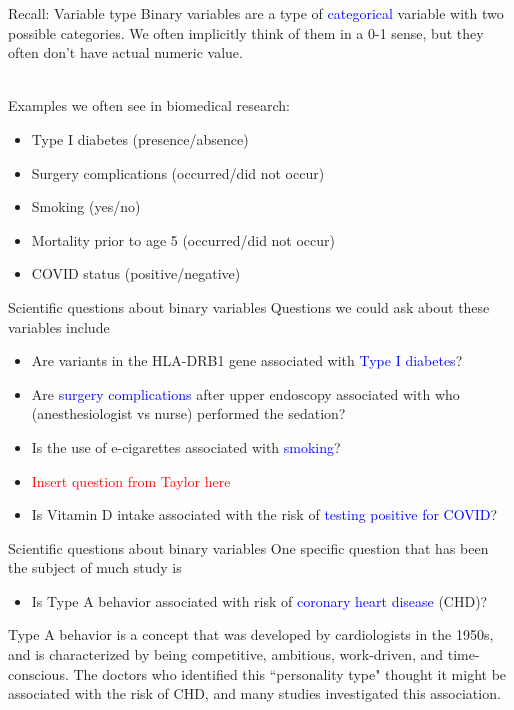 \documentclass[10pt,t]{beamer}
\begin{document}
\begin{frame}{Recall: Variable type}
Binary variables are a type of \textcolor{blue}{categorical} variable with two possible categories. We often implicitly think of them in a 0-1 sense, but they often don't have actual numeric value. 
\\~\

Examples we often see in biomedical research: 
\begin{itemize}
	\item Type I diabetes (presence/absence)
	\item Surgery complications (occurred/did not occur)
	\item Smoking (yes/no)
	\item Mortality prior to age 5 (occurred/did not occur)
	\item COVID status (positive/negative)
\end{itemize}
\end{frame}

\begin{frame}{Scientific questions about binary variables}
	Questions we could ask about these variables include
	\begin{itemize}
		\item Are variants in the HLA-DRB1 gene associated with \textcolor{blue}{Type I diabetes}? 
		\item Are \textcolor{blue}{surgery complications} after upper endoscopy associated with who (anesthesiologist vs nurse) performed the sedation?
		\item Is the use of e-cigarettes associated with \textcolor{blue}{smoking}?
		\item \textcolor{red}{Insert question from Taylor here}
		\item Is Vitamin D intake associated with the risk of \textcolor{blue}{testing positive for COVID}?
	\end{itemize}
\end{frame}

\begin{frame}{Scientific questions about binary variables}
	One specific question that has been the subject of much study is 
	\begin{itemize}
		\item Is Type A behavior associated with risk of \textcolor{blue}{coronary heart disease} (CHD)?
	\end{itemize}
	\vspace{0.7cm}
	Type A behavior is a concept that was developed by cardiologists in the 1950s, and is characterized by being competitive, ambitious, work-driven, and time-conscious. The doctors who identified this ``personality type" thought it might be associated with the risk of CHD, and many studies investigated this association. 
\end{frame}
\end{document}
